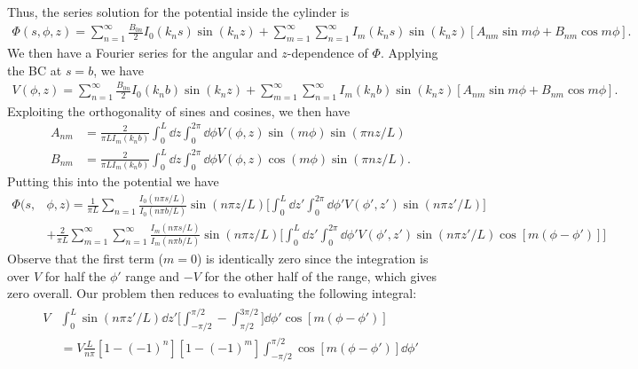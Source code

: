 {Thus, the series solution for the potential inside the cylinder is
\begin{eqnarray}
    \Phi(s,\phi,z) = \sum_{n=1}^{\infty} \frac{B_{0n}}{2} I_0(k_{n}s) \sin(k_{n}z) + \sum_{m=1}^{\infty} \sum_{n=1}^{\infty} I_{m}(k_{n}s) \sin(k_{n}z) [ A_{nm} \sin{m\phi} + B_{nm} \cos{m\phi} ]
.\end{eqnarray}
We then have a Fourier series for the angular and $z$-dependence of $\Phi$.
Applying the BC at $s = b$, we have
\begin{eqnarray}
    V(\phi,z) = \sum_{n=1}^{\infty} \frac{B_{0n}}{2} I_{0}(k_{n} b) \sin(k_{n}z) + \sum_{m=1}^{\infty} \sum_{n=1}^{\infty} I_{m}(k_{n} b) \sin(k_{n} z) [ A_{nm} \sin{m\phi} + B_{nm} \cos{m \phi} ]
.\end{eqnarray}
Exploiting the orthogonality of sines and cosines, we then have
\begin{align}
    A_{nm} &= \frac{2}{\pi L I_{m}(k_{n}b)} \int_{0}^{L} \dd{z} \int_{0}^{2 \pi} \dd{\phi} V(\phi,z) \sin(m \phi) \sin(\pi n z / L) \\
    B_{nm} &= \frac{2}{\pi L I_{m}(k_{n}b)} \int_{0}^{L} \dd{z} \int_{0}^{2 \pi} \dd{\phi} V(\phi,z) \cos(m \phi) \sin(\pi n z / L)
.\end{align}
Putting this into the potential we have 
\begin{align}
    \Phi(s,&\phi,z) = \frac{1}{\pi L} \sum_{n=1} \frac{I_{0}(n \pi s / L)}{I_0(n \pi b / L)} \sin(n \pi z / L) \Bigg[ \int_{0}^{L} \dd{z'} \int_{0}^{2\pi} \dd{\phi'} V(\phi',z') \sin(n\pi z' / L) \Bigg] \nonumber \\
                   &+ \frac{2}{\pi L} \sum_{m=1}^{\infty} \sum_{n=1}^{\infty} \frac{I_{m}(n \pi s / L)}{I_{m}(n \pi b / L)} \sin(n \pi z / L) \Bigg[ \int_{0}^{L} \dd{z'} \int_{0}^{2\pi} \dd{\phi'} V(\phi',z') \sin(n\pi z' / L) \cos[m(\phi - \phi')] \Bigg]
\end{align}
Observe that the first term ($m = 0$) is identically zero since the integration is over $V$ for half the $\phi'$ range and $-V$ for the other half of the range, which gives zero overall.
Our problem then reduces to evaluating the following integral:
\begin{eqnarray}
\begin{aligned}
    V &\int_{0}^{L} \sin(n\pi z' / L) \dd{z'} \Bigg[ \int_{-\pi/2}^{\pi/2} - \int_{\pi/2}^{3\pi/2} \Bigg] \dd{\phi'} \cos[m(\phi-\phi')] \\
      &= V \frac{L}{n\pi} [1 - (-1)^{n}] [1 - (-1)^{m}] \int_{-\pi/2}^{\pi/2} \cos[m(\phi-\phi')] \dd{\phi'} \\

\end{aligned}
\end{eqnarray}}
